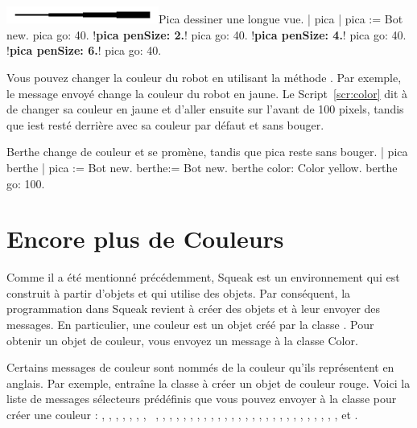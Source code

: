 \documentclass[a4paper,10pt,twoside]{book}
\begin{document}
\begin{scriptfigwithsize}[0.4]{\includegraphics[width=5cm]{turtleMPenSize}}{Pica dessiner une longue vue.}\label{scr:spyglass}
| pica | 
pica := Bot new. 
pica go: 40. 
!\textbf{pica penSize: 2.}!
pica go: 40. 
!\textbf{pica penSize: 4.}!
pica go: 40. 
!\textbf{pica penSize: 6.}!
pica go: 40. 
\end{scriptfigwithsize}

Vous pouvez changer la couleur du robot en utilisant la m\'ethode . Par exemple, 
le message envoy\'e  change la couleur du robot en jaune. 
Le Script~\ref{scr:color} dit \`a  de changer sa couleur en jaune et d'aller ensuite sur 
l'avant de 100 pixels, tandis que  iest rest\'e derri\`ere avec sa couleur par d\'efaut et sans bouger.

\begin{script}[color]{Berthe change de couleur et se prom\`ene, tandis que pica reste sans bouger. }
	| pica berthe | 
	pica := Bot new. 
	berthe:= Bot new. 
	berthe color: Color yellow. 
	berthe go: 100. 
\end{script}

\section{Encore plus de Couleurs}

Comme il a \'et\'e mentionn\'e pr\'ec\'edemment, Squeak est un environnement qui est construit \`a partir 
d'objets et qui utilise des objets. Par cons\'equent, la programmation dans Squeak revient \`a cr\'eer 
des objets et \`a leur envoyer des messages. En particulier, une couleur est un objet cr\'e\'e par la 
classe . Pour obtenir un objet de couleur, vous envoyez un message \`a la classe Color.

Certains messages de couleur sont nomm\'es de la couleur qu'ils repr\'esentent en anglais. Par exemple, 
 entraîne la classe  \`a cr\'eer un objet de couleur rouge. Voici la liste de 
messages s\'electeurs pr\'ed\'efinis que vous pouvez envoyer \`a la classe  pour cr\'eer une couleur : 
, , , , , , ,
~, , , , , , , , , , , , , , 
, , , , ,
, , , , , , , , et . 
\end{document}
